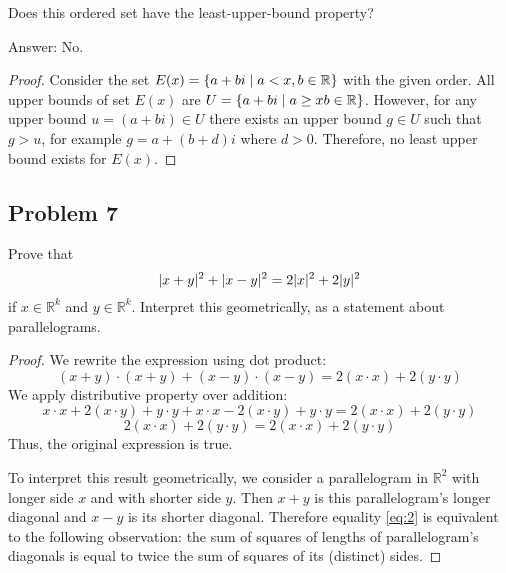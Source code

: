 \documentclass{article}
\newcommand{\R}{\mathbb{R}}
\DeclarePairedDelimiter{\abs}{\lvert}{\rvert}
\DeclarePairedDelimiter{\set}{ \{ }{ \} }
\begin{document}
\begin{tcolorbox}
Does this ordered set have the least-upper-bound
property? 
\end{tcolorbox}

Answer: No.

\begin{proof}

Consider the set $E(x) = \set{ a+bi \mid a<x, b \in \R }$ with the given order.
All upper bounds of set $E(x)$ are $U = \set{a+bi \mid a \geq x b \in \R}$. 
However, for any upper bound $u = (a+bi) \in U$ there exists an upper bound $g \in U$ such that $g > u$, for example $g = a+(b+d)i$ where $d>0$. 
Therefore, no least upper bound exists for $E(x)$.

\end{proof}


\subsection*{Problem 7}

\begin{tcolorbox}
Prove that
\begin{equation} \label{eq:2}
    \abs{ x + y }^2 + \abs{ x - y }^2 = 2\abs{x}^2 + 2\abs{y}^2    
\end{equation}
if $x \in \R^k$ and $y \in \R^k$.
Interpret this geometrically, as a statement about parallelograms.
\end{tcolorbox}

\begin{proof}

We rewrite the expression using dot product:
\[ (x+y) \cdot (x+y) + (x-y) \cdot (x-y) = 2 (x\cdot x) + 2 (y\cdot y) \]
We apply distributive property over addition:
\[ x \cdot x + 2(x \cdot y) + y \cdot y + x \cdot x - 2(x \cdot y) + y \cdot y = 2 (x \cdot x) + 2 (y\cdot y) \]
\[ 2 (x\cdot x) + 2 (y\cdot y) = 2 (x\cdot x) + 2 (y\cdot y) \]
Thus, the original expression is true.

To interpret this result geometrically, we consider a parallelogram in $\R^2$ with longer side $x$ and with shorter side $y$.
Then $x+y$ is this parallelogram's longer diagonal and $x-y$ is its shorter diagonal.
Therefore equality \ref{eq:2} is equivalent to the following observation:
the sum of squares of lengths of parallelogram's diagonals is equal to twice the sum of squares of its (distinct) sides.

\end{proof}
\end{document}
